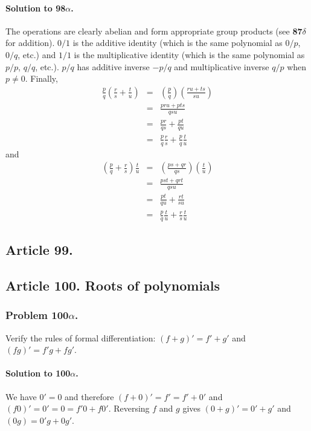 \paragraph*{Solution to 98$\alpha$.}
The operations are clearly abelian and form appropriate group products (see
\textbf{87$\delta$} for addition). $0/1$ is the additive identity (which is
the same polynomial as $0/p$, $0/q$, etc.) and $1/1$ is the multiplicative identity
(which is the same polynomial as $p/p$, $q/q$, etc.). $p/q$ has additive inverse
$-p/q$ and multiplicative inverse $q/p$ when $p \neq 0$. Finally,
\begin{eqnarray*}
\frac{p}{q}\left(\frac{r}{s} + \frac{t}{u}\right) & = &
    \left(\frac{p}{q}\right)\left(\frac{ru+ts}{su}\right) \\
& = & \frac{pru+pts}{qsu} \\
& = & \frac{pr}{qs} + \frac{pt}{qu} \\
& = & \frac{p}{q}\frac{r}{s} + \frac{p}{q}\frac{t}{u}
\end{eqnarray*}
and
\begin{eqnarray*}
\left(\frac{p}{q}+\frac{r}{s}\right)\frac{t}{u} & = &
    \left(\frac{ps+qr}{qs}\right)\left(\frac{t}{u}\right) \\
& = & \frac{pst+qrt}{qsu} \\
& = & \frac{pt}{qu} + \frac{rt}{su} \\
& = & \frac{p}{q}\frac{t}{u} + \frac{r}{s}\frac{t}{u}
\end{eqnarray*}
\subsection{Article 99.}

\subsection{Article 100. Roots of polynomials}

\subsubsection{Problem 100$\alpha$.}
Verify the rules of formal differentiation: $(f+g)' = f' + g'$ and $(fg)' =
f'g + fg'$.

\paragraph*{Solution to 100$\alpha$.}
We have $0' = 0$ and therefore $(f+0)' = f' = f' + 0'$ and $(f0)' = 0' = 0 =
f'0 + f0'$. Reversing $f$ and $g$ gives $(0 + g)' = 0' + g'$ and $(0g) = 0'g + 0g'$.

